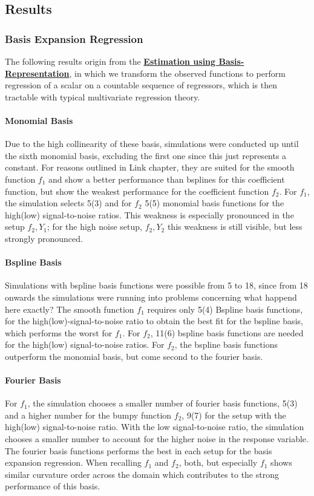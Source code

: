 \documentclass[11pt,twoside,a4paper]{article}
\begin{document}
	
	\subsection{Results}	
	
	\subsubsection{Basis Expansion Regression}
	The following results origin from the \hyperref[basis_exp_transf]{\textbf{Estimation using Basis-Representation}}, in which we transform the observed functions to perform regression of a scalar on a countable sequence of regressors, which is then tractable with typical multivariate regression theory. 
	
	\paragraph{Monomial Basis}
	Due to the high collinearity of these basis, simulations were conducted up until the sixth monomial basis, excluding the first one since this just represents a constant. For reasons outlined in {\color{green} Link chapter}, they are suited for the smooth function $f_1$ and show a better performance than bsplines for this coefficient function, but show the weakest performance for the coefficient function $f_2$. For $f_1$, the simulation selects 5(3) and for $f_2$ 5(5) monomial basis functions for the high(low) signal-to-noise ratios. This weakness is especially pronounced in the setup $f_2,Y_1$; for the high noise setup, $f_2, Y_2$ this weakness is still visible, but less strongly pronounced.
	
	\paragraph{Bspline Basis}
	Simulations with bspline basis functions were possible from 5 to 18, since from 18 onwards the simulations were running into problems concerning {\color{green} what happend here exactly?}
The smooth function $f_1$ requires only 5(4) Bspline basis functions, for the high(low)-signal-to-noise ratio to obtain the best fit for the bspline basis, which performs the worst for $f_1$. For $f_2$, 11(6) bspline basis functions are needed for the high(low) signal-to-noise ratios. For $f_2$, the bspline basis functions outperform the monomial basis, but come second to the fourier basis.
	
	\paragraph{Fourier Basis}
	For $f_1$, the simulation chooses a smaller number of fourier basis functions, 5(3) and a higher number for the bumpy function $f_2$, 9(7) for the setup with the high(low) signal-to-noise ratio. With the low signal-to-noise ratio, the simulation chooses a smaller number to account for the higher noise in the response variable. The fourier basis functions performs the best in each setup for the basis expansion regression. When recalling $f_1$ and $f_2$, both, but especially $f_1$ shows similar curvature order across the domain which contributes to the strong performance of this basis.
	\\
	
\end{document}
